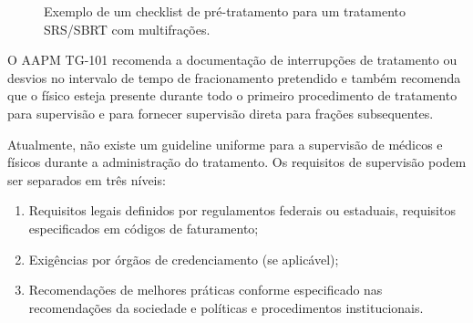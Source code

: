\documentclass[11pt,a4paper]{article}
\begin{document}
	\begin{figure}[!h]
		\centering
		\caption{Exemplo de um checklist de pré-tratamento para um tratamento SRS/SBRT com multifrações.}
		\label{fig:srsChecklistPretratamento}
	\end{figure}

	O AAPM TG-101 recomenda a documentação de interrupções de tratamento ou desvios no intervalo de tempo de fracionamento pretendido e também recomenda que o físico esteja presente durante todo o primeiro procedimento de tratamento para supervisão e para fornecer supervisão direta para frações subsequentes.

	Atualmente, não existe um guideline uniforme para a supervisão de médicos e físicos durante a administração do tratamento. Os requisitos de supervisão podem ser separados em três níveis:

	\begin{enumerate}[label=\textcolor{CarnationPink}{\arabic*${}^\circ$}]
		\item Requisitos legais definidos por regulamentos federais ou estaduais, requisitos especificados em códigos de faturamento;
		\item Exigências por órgãos de credenciamento (se aplicável);
		\item Recomendações de melhores práticas conforme especificado nas recomendações da sociedade e políticas e procedimentos institucionais.
	\end{enumerate}
\end{document}
